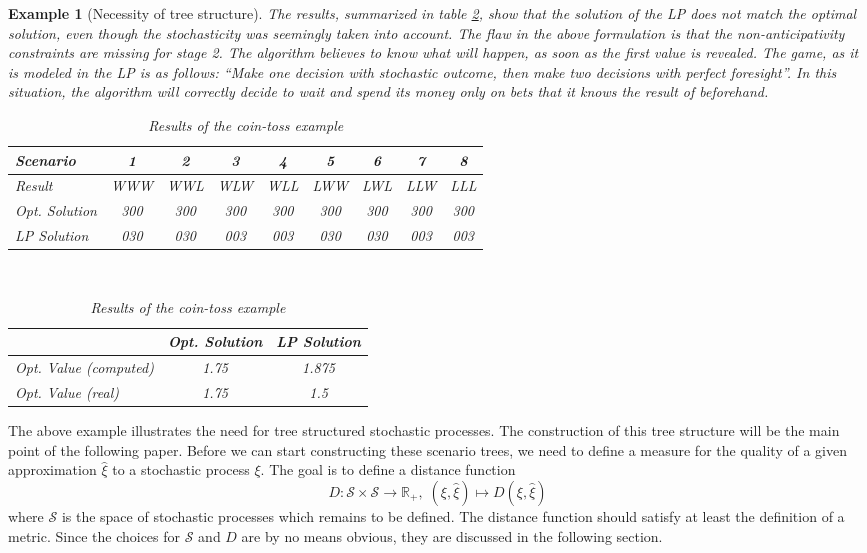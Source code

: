 \documentclass[a4paper, 12pt] {article}
\newtheorem*{example}{Example}
\begin{document}
\begin{example}[Necessity of tree structure]
  The results, summarized in table \ref{tab:coin-toss-results}, show that the solution of the LP does not match the optimal solution, even though the stochasticity was seemingly taken into account. 
  The flaw in the above formulation is that the non-anticipativity constraints are missing for stage 2. 
  The algorithm believes to know what will happen, as soon as the first value is revealed. 
  The game, as it is modeled in the LP is as follows: 
  ``Make one decision with stochastic outcome, then make two decisions with perfect foresight''. 
  In this situation, the algorithm will correctly decide to wait and spend its money only on bets that it knows the result of beforehand.
  \begin{table}
    \small\centering
    \begin{tabular}{lcccccccc}
      \hline 
      Scenario&1&2&3&4&5&6&7&8\\\hline\hline
      Result&WWW&WWL&WLW&WLL&LWW&LWL&LLW&LLL\\
      Opt. Solution&300&300&300&300&300&300&300&300\\
      LP Solution&030&030&003&003&030&030&003&003\\\hline
    \end{tabular}
    \vspace*{0.5cm}\\
    \begin{tabular}{lcc}
      \hline
      &Opt. Solution&LP Solution\\\hline\hline
      Opt. Value (computed)&1.75&1.875\\
      Opt. Value (real)&1.75&1.5\\
      \hline
    \end{tabular}
    \caption{Results of the coin-toss example}
    \label{tab:coin-toss-results}
  \end{table}
\end{example}

The above example illustrates the need for tree structured stochastic processes. The construction of this tree structure will be the main point of the following paper. Before we can start constructing these scenario trees, we need to define a measure for the quality of a given approximation $\hat{\xi}$ to a stochastic process $\xi$. The goal is to define a distance function 
\begin{equation}
  \label{eq:distance-function-intro}
  D:\mathcal{S} \times \mathcal{S} \rightarrow \mathbb{R}_+,\;(\xi, \hat{\xi})\mapsto D(\xi, \hat{\xi})
\end{equation}
where $\mathcal{S}$ is the space of stochastic processes which remains to be defined. The distance function should satisfy at least the definition of a metric. Since the choices for $\mathcal{S}$ and $D$ are by no means obvious, they are discussed in the following section.
\end{document}
